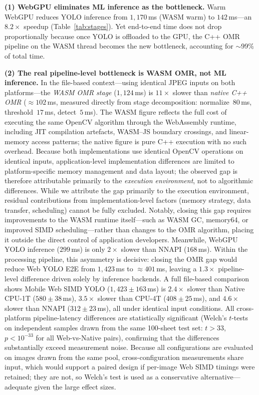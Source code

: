 \documentclass[conference]{IEEEtran}
\begin{document}
\textbf{(1) WebGPU eliminates ML inference as the bottleneck.}
Warm WebGPU reduces YOLO inference from $1{,}170$\,ms (WASM warm) to
$142$\,ms---an $8.2\times$ speedup (Table~\ref{tab:stages}).
Yet end-to-end time does not drop proportionally because once YOLO is
offloaded to the GPU, the C++ OMR pipeline on the WASM thread becomes
the new bottleneck, accounting for $\sim$99\% of total time.

\textbf{(2) The real pipeline-level bottleneck is WASM OMR, not ML inference.}
In the file-based context---using identical JPEG inputs on both platforms---the
\emph{WASM OMR stage} ($1{,}124$\,ms) is $11\times$ slower than \emph{native
C++ OMR} ($\approx102$\,ms, measured directly from stage decomposition:
normalize~$80$\,ms, threshold~$17$\,ms, detect~$5$\,ms).
The WASM figure reflects the full cost of executing the same OpenCV algorithm
through the WebAssembly runtime, including JIT compilation artefacts,
WASM--JS boundary crossings, and linear-memory access patterns; the native
figure is pure C++ execution with no such overhead.
Because both implementations use identical OpenCV operations on identical
inputs, application-level implementation differences are limited to
platform-specific memory management and data layout; the
observed gap is therefore attributable primarily to the \emph{execution
environment}, not to algorithmic differences.
While we attribute the gap primarily to the execution environment,
residual contributions from implementation-level factors (memory
strategy, data transfer, scheduling) cannot be fully excluded.
Notably, closing this gap requires improvements to the WASM runtime
itself---such as WASM GC, memory64, or improved SIMD scheduling---rather
than changes to the OMR algorithm, placing it outside the direct control
of application developers.
Meanwhile, WebGPU YOLO inference ($299$\,ms) is only $2\times$ slower
than NNAPI ($168$\,ms).
Within the processing pipeline, this asymmetry is decisive: closing the OMR
gap would reduce Web YOLO E2E from $1{,}423$\,ms to $\approx401$\,ms,
leaving a $1.3\times$ pipeline-level difference driven solely by inference
backends.
A full file-based comparison shows Mobile Web SIMD YOLO
($1{,}423\pm163$\,ms) is $2.4\times$ slower than Native CPU-1T
($580\pm38$\,ms), $3.5\times$ slower than CPU-4T ($408\pm25$\,ms),
and $4.6\times$ slower than NNAPI ($312\pm23$\,ms), all under identical
input conditions.
All cross-platform pipeline-latency differences are statistically
significant (Welch's $t$-tests on independent samples drawn from the
same 100-sheet test set: $t>33$, $p<10^{-33}$ for all
Web-vs-Native pairs), confirming that the differences substantially exceed
measurement noise.
Because all configurations are evaluated on images drawn from the same
pool, cross-configuration measurements share input, which would support
a paired design if per-image Web SIMD timings were retained; they are
not, so Welch's test is used as a conservative alternative---adequate
given the large effect sizes.
\end{document}

